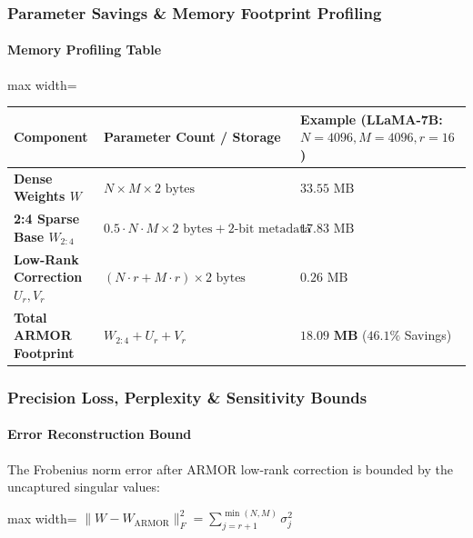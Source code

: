 \subsubsection*{Parameter Savings \& Memory Footprint Profiling}

\paragraph{Memory Profiling Table}

\begin{center}
\begin{adjustbox}{max width=\columnwidth}
\renewcommand{\arraystretch}{1.2}
\begin{tabular}{lll}
\toprule
Component & Parameter Count / Storage & Example (LLaMA-7B: $N=4096, M=4096, r=16$) \\
\midrule
\textbf{Dense Weights $W$} & $N \times M \times 2 \text{ bytes}$ & $33.55 \text{ MB}$ \\
\textbf{2:4 Sparse Base $W_{2:4}$} & $0.5 \cdot N \cdot M \times 2 \text{ bytes} + 2\text{-bit metadata}$ & $17.83 \text{ MB}$ \\
\textbf{Low-Rank Correction $U_r, V_r$} & $(N \cdot r + M \cdot r) \times 2 \text{ bytes}$ & $0.26 \text{ MB}$ \\
\textbf{Total ARMOR Footprint} & $W_{2:4} + U_r + V_r$ & $\mathbf{18.09\text{ MB}}$ ($46.1\%$ Savings) \\

\bottomrule
\end{tabular}
\end{adjustbox}
\end{center}

\subsubsection*{Precision Loss, Perplexity \& Sensitivity Bounds}

\paragraph{Error Reconstruction Bound}

The Frobenius norm error after ARMOR low-rank correction is bounded by the uncaptured singular values:

\begin{center}
\begin{adjustbox}{max width=\columnwidth}
$\displaystyle
\| W - W_{\text{ARMOR}} \|_F^2 = \sum_{j=r+1}^{\min(N, M)} \sigma_j^2
$
\end{adjustbox}
\end{center}

